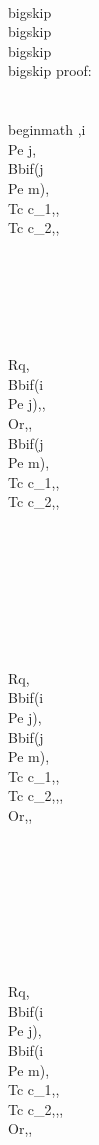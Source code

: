 \\bigskip
\\bigskip
\\bigskip
\\bigskip
proof:\\\\
\\begin{math} 
,i \\Pe j, \\Bb{if(j \\Pe m)}{,\\Tc c_1,}{,\\Tc c_2,},\\\\\\\\\\\\
\\Rq, \\Bb{if(i \\Pe j)}{,}{, \\Or,}, \\Bb{if(j \\Pe m)}{,\\Tc c_1,}{,\\Tc c_2,},\\\\\\\\\\\\\\\\
\\Rq, \\Bb{if(i \\Pe j)}{,\\Bb{if(j \\Pe m)}{,\\Tc c_1,}{,\\Tc c_2,},}{, \\Or,}, \\\\\\\\\\\\\\\\
\\Rq, \\Bb{if(i \\Pe j)}{,\\Bb{if(i \\Pe m)}{,\\Tc c_1,}{,\\Tc c_2,},}{, \\Or,}, \\\\\\\\\\\\
